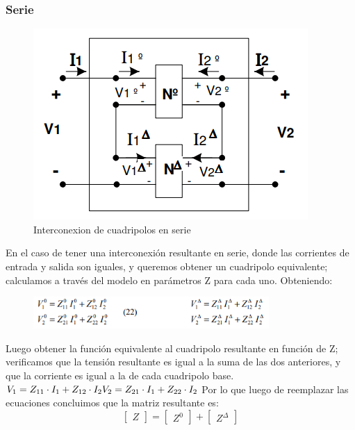 \documentclass[../main.tex]{subfiles}
\begin{document}
{		\subsubsection{Serie}
		\begin{figure}[H]
			\centering
			\includegraphics[width=\textwidth]{imagen5.png}
			\caption{Interconexion de cuadripolos en serie}
		\end{figure}
		En el caso de tener una interconexión resultante en serie, donde las
		corrientes de entrada y salida son iguales, y queremos obtener un 
		cuadripolo equivalente; calculamos a través del modelo en parámetros
		Z para cada uno. Obteniendo:
		\begin{figure}[H]
			\centering
			\includegraphics[width=0.8\textwidth]{imagen6.png}
		\end{figure}
		Luego obtener la función equivalente al cuadripolo resultante en
		función de Z; verificamos que la tensión resultante es igual a la
		suma de las dos anteriores, y que la corriente es igual a la de cada cuadripolo base.\\
		\(
			V_1 = Z_{11} \cdot I_{1}	+	Z_{12} \cdot I_{2} \\
			V_2 = Z_{21} \cdot I_{1}	+	Z_{22} \cdot I_{2} 
		\)
		Por lo que luego de reemplazar las ecuaciones concluimos que la matriz resultante es:
		\[
		\begin{bmatrix} Z \end{bmatrix} 
			=
		\begin{bmatrix} Z^0 \end{bmatrix} 
			+
		\begin{bmatrix} Z^{\Delta} \end{bmatrix} 
		\]

}
\end{document}
